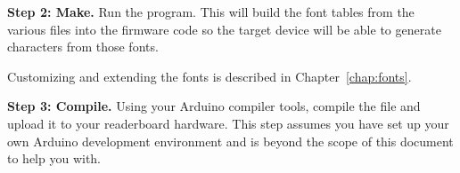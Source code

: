 {\bfseries Step 2: Make.}
		Run the  program. This will build the font tables from the various
		 files into the firmware code so the target device will be able to
		generate characters from those fonts.

		Customizing and extending the fonts is described in Chapter~\ref{chap:fonts}.

{\bfseries Step 3: Compile.}
		Using your Arduino compiler tools, compile the  file and upload it
		to your readerboard hardware. This step assumes you have set up your own Arduino
		development environment and is beyond the scope of this document to help you with.


